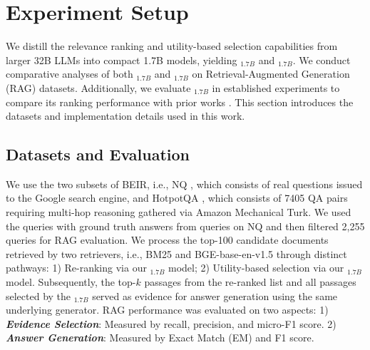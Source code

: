 \section{Experiment Setup}
We distill the relevance ranking and utility-based selection capabilities from larger 32B LLMs into compact 1.7B models, yielding \rank$_{1.7B}$  and \utility$_{1.7B}$. We conduct comparative analyses of both \rank$_{1.7B}$  and \utility$_{1.7B}$  on Retrieval-Augmented Generation (RAG) datasets.  Additionally, we evaluate \rank$_{1.7B}$ in established experiments to compare its ranking performance with prior works \cite{robertson2009probabilistic, bge_embedding, nogueira2019passage, nogueira2020document, sachan2022improving}. 
This section introduces the datasets and implementation details used in this work. 

\subsection{Datasets and Evaluation} 

We use the two subsets of BEIR, i.e., NQ \cite{kwiatkowski2019natural}, which consists of real questions issued to the Google search engine, and HotpotQA \cite{yang2018hotpotqa}, which consists of 7405 QA pairs requiring multi-hop reasoning gathered via Amazon Mechanical Turk. 
We used the queries with ground truth answers from queries on NQ and then filtered 2,255 queries for RAG evaluation.  
We process the top-100 candidate documents retrieved by two retrievers, i.e., BM25 \cite{robertson2009probabilistic} and BGE-base-en-v1.5 \cite{bge_embedding} through distinct pathways:
1) Re-ranking via our \rank$_{1.7B}$ model; 
2) Utility-based selection via our \utility$_{1.7B}$ model. 
Subsequently, the top-$k$ passages from the re-ranked list and all passages selected by the \utility$_{1.7B}$ served as evidence for answer generation using the same underlying generator. 
RAG performance was evaluated on two aspects:
1) \textbf{\textit{Evidence Selection}}: Measured by recall, precision, and micro-F1 score. 
2) \textbf{\textit{Answer Generation}}: Measured by Exact Match (EM) and F1 score.

